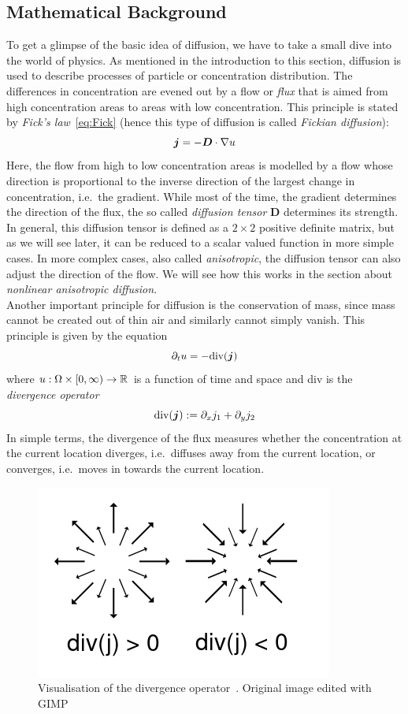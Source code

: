 \subsection{Mathematical Background}
To get a glimpse of the basic idea of diffusion, we have to take a small dive into the world of
physics.
As mentioned in the introduction to this section, diffusion is used to describe processes of
particle or concentration distribution. The differences in concentration are evened out by a flow
or \textit{flux} that is aimed from high concentration areas to areas with low concentration. This
principle is stated by \textit{Fick's law}~\eqref{eq:Fick} (hence this type of diffusion is called \textit{Fickian
diffusion}):
\begin{equation}
    \boldsymbol j = -\boldsymbol D\cdot\mathbf{\nabla} u\label{eq:Fick}
\end{equation}
Here, the flow from high to low concentration areas is modelled by a flow whose direction is
proportional to the inverse direction of the largest change in concentration, i.e.\ the gradient.
While most of the time, the gradient determines the direction of the flux, the so called
\textit{diffusion tensor} $\boldsymbol D$ determines its strength. In general, this diffusion
tensor is defined as a
$2\times2$ positive definite matrix, but as we will see later, it can be reduced to a scalar 
valued function in more simple cases.
In more complex cases, also called \textit{anisotropic}, the diffusion tensor can also adjust the
direction of the flow. We will see how this works in the section about \textit{nonlinear
anisotropic diffusion}.\\
Another important principle for diffusion is the conservation of mass, since mass cannot be created
out of thin air and similarly cannot simply vanish.
This principle is given by the equation
\begin{equation}
    \partial_t u = - \textnormal{div}(\boldsymbol j)\label{eq:Conservation}
\end{equation}
where $u: \Omega \times [0, \infty) \rightarrow \mathbb{R}$ is a function of time and space and div
is the \textit{divergence operator}
\begin{equation}
    \textnormal{div}(\boldsymbol j) := \partial_x j_1 + \partial_y j_2
\end{equation}
In simple terms, the divergence of the flux measures whether the concentration at the current
location diverges, i.e.\ diffuses away from the current location, or converges, i.e.\ moves in
towards the current location.
\begin{figure}[H]
    \centering
    \includegraphics[width=0.5\linewidth]{../Images/divergence2.png}
    \caption{Visualisation of the divergence operator~\cite{img-divergence}. Original image edited
    with GIMP~\cite{gimp}}\label{fig:Divergence}
\end{figure}
